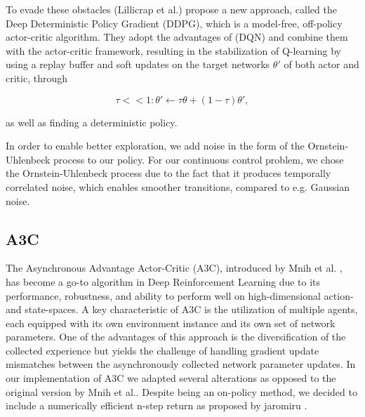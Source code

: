 \documentclass[letterpaper, 10 pt, conference]{ieeeconf}  %
\begin{document}
To evade these obstacles (Lillicrap et al.) propose a new approach, called the Deep Deterministic Policy Gradient (DDPG), which is a model-free, off-policy actor-critic algorithm. They adopt the advantages of (DQN) and combine them with the actor-critic framework, resulting in the stabilization of Q-learning by using a replay buffer and soft updates on the target networks $\theta'$ of both actor and critic, through

\begin{equation}
\tau << 1:\theta' \leftarrow \tau\theta + (1-\tau)\theta',
\end{equation}

as well as finding a deterministic policy.

In order to enable better exploration, we add noise in the form of the Ornstein-Uhlenbeck process to our policy. For our continuous control problem, we chose the Ornstein-Uhlenbeck process due to the fact that it produces temporally correlated noise, which enables smoother transitions, compared to e.g. Gaussian noise. 

\subsection{A3C}
The Asynchronous Advantage Actor-Critic (A3C), introduced by Mnih et al. \cite{mnihAsynchronousMethodsDeep2016}, has become a go-to algorithm in 
Deep Reinforcement Learning due to its performance, robustness, and ability to perform well on high-dimensional action- and state-spaces. 
A key characteristic of A3C is the utilization of multiple agents, each equipped with its own environment instance and its own set of network parameters. 
One of the advantages of this approach is the diversification of the collected experience but yields the challenge of handling gradient update 
mismatches between the asynchronously collected network parameter updates. 
In our implementation of A3C we adapted several alterations as opposed to the original version by Mnih et al.. Despite being an on-policy method, we decided 
to include a numerically efficient n-step return as proposed by jaromiru \cite{janischLetMakeA3C}. %
\end{document}
